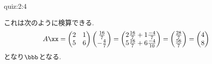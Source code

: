 \begin{answerof}{quiz:2:4}
\begin{enumerate}
  これは次のように検算できる.
  \begin{align*}
    A\xx=
    \begin{pmatrix}
      2&1\\5&6
    \end{pmatrix}
    \begin{pmatrix}
      \frac{16}{7}\\-\frac{4}{7}
    \end{pmatrix}
    =
    \begin{pmatrix}
      2\frac{16}{7}+1\frac{-4}{7}\\5\frac{16}{7}+6\frac{-4}{10}
    \end{pmatrix}
    =
    \begin{pmatrix}
      \frac{28}{7}\\\frac{56}{7}
    \end{pmatrix}
    =
    \begin{pmatrix}
      4\\8
    \end{pmatrix}
  \end{align*}
  となり$\bbb$となる.
\end{enumerate}
\end{answerof}


\endinput
\section{行列と連立方程式に関する問題}


